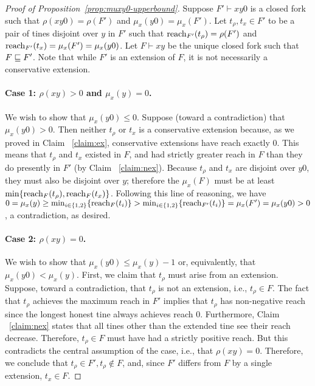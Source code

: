 \begin{proof}[Proof of Proposition~\ref{prop:muxy0-upperbound}]
  Suppose $F'\vdash xy0$ is a closed fork such that 
  $\rho(xy0)=\rho(F')$ and $\mu_x(y0)=\mu_x(F')$. 
  Let $t_\rho, t_x \in F'$ to be a pair of tines disjoint over $y$ in $F'$ such that $\operatorname{reach}_{F'}(t_\rho)=\rho(F')$ and $\operatorname{reach}_{F'}(t_x)=\mu_x(F')=\mu_x(y0)$. 
  Let $F\vdash xy$ be the unique closed fork such that $F\sqsubseteq F'$.  
  Note that while $F'$ is an extension of $F$, 
  it is not necessarily a conservative extension.

  \paragraph{Case 1: $\rho(xy)>0$ and $\mu_x(y)=0$.} 
    We wish to show that $\mu_x(y0) \leq 0$.
    Suppose (toward a contradiction) that $\mu_x(y0) > 0$. 
    Then neither $t_\rho$ or $t_x$ is a conservative extension because, as we proved in Claim ~\ref{claim:ex}, conservative extensions have reach exactly 0. This means that $t_\rho$ and $t_x$ existed in $F$, and had strictly greater reach in $F$ than they do presently in $F'$ (by Claim ~\ref{claim:nex}). 
    Because $t_\rho$ and $t_x$ 
    are 
    disjoint over $y0$, they must also be disjoint over $y$; therefore the $\mu_x(F)$ must be at least $\min\{\operatorname{reach}_F(t_\rho),\operatorname{reach}_F(t_x)\}$. 
    Following this line of reasoning, we have 
    $0 
    = \mu_x(y) 
    \geq \min_{i \in \{1,2\}}\{\operatorname{reach}_F(t_i)\}
    > \min_{i \in \{1,2\}}\{\operatorname{reach}_{F'}(t_i)\}
    = \mu_x(F') = \mu_x(y0) > 0
    $, a contradiction, as desired.

  \paragraph{Case 2: $\rho(xy)=0$.}
    We wish to show that $\mu_x(y0) \leq \mu_x(y) - 1$
    or, equivalently, that $\mu_x(y0) < \mu_x(y)$. 
    First, we claim that $t_\rho$ must arise from an extension. 
    Suppose, toward a contradiction, that $t_\rho$ is not an extension, 
    i.e., $t_\rho \in F$. 
    The fact that $t_\rho$ achieves the maximum reach in $F'$ 
    implies that 
    $t_\rho$ has non-negative reach 
    since the longest honest tine always achieves reach 0. 
    Furthermore, 
    Claim ~\ref{claim:nex} states that 
    all tines other than the extended tine see their reach decrease. 
    Therefore, $t_\rho \in F$ must have had a strictly positive reach. 
    But this contradicts the central assumption of the case, i.e., 
    that $\rho(xy)=0$. 
    Therefore, we conclude that $t_\rho \in F', t_\rho \not \in F$, and, 
    since $F'$ differs from $F$ by a single extension, 
    $t_x \in F$.


\end{proof}
